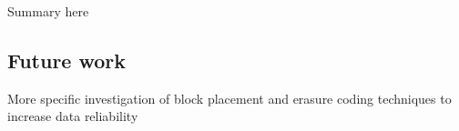 Summary here

\subsection{Future work}
More specific investigation of block placement and erasure coding techniques to increase data reliability \cite{DBLP:conf/usenix/CidonRSKOR13, DBLP:conf/usenix/HuangSXOCG0Y12}